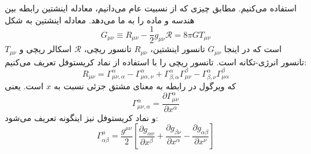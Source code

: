 \cite{dodelson2003modern}
استفاده می‌کنیم. مطابق چیزی که از نسبیت عام می‌دانیم، معادله اینشتین رابطه بین هندسه و ماده را به ما می‌دهد. معادله اینشتین به شکل
 \begin{equation}
G_{\mu\nu} \equiv R_{\mu\nu} - \frac{1}{2} g_{\mu\nu} \mathcal{R} = 8\pi G T_{\mu\nu}
\end{equation}     
است که در اینجا 
$G_{\mu\nu}$
تانسور اینشتین، 
$R_{\mu\nu}$
تانسور ریچی،
$\mathcal{R}$
اسکالر ریچی و 
$T_{\mu\nu}$
تانسور انرژی-تکانه است. 
تانسور ریچی را با استفاده از نماد کریستوفل تعریف می‌کنیم:
\begin{equation}
R_{\mu\nu} = \Gamma^{\alpha}_{\mu \nu , \alpha} - \Gamma^{\alpha}_{\mu \alpha , \nu}
+ \Gamma^{\alpha}_{\beta , \alpha} \Gamma^{\beta}_{\mu \nu}
- \Gamma^{\alpha}_{\beta , \nu} \Gamma^{\beta}_{\mu \alpha}
\end{equation}  
که ویرگول در رابطه به معنای مشتق جزئی نسبت به $x$ است. یعنی
\begin{equation}
\Gamma^{\alpha}_{\mu \nu , \alpha} = \frac{\partial \Gamma^{\alpha}_{\mu \nu } }{\partial x^{\alpha}}
\end{equation} 
و نماد کریستوفل نیز اینگونه تعریف می‌شود: 
\begin{equation}
\Gamma^{\mu}_{\alpha \beta } = \frac{g^{\mu \nu}}{2} [\frac{\partial g_{\alpha \nu}}{\partial x^{\beta}}
+ \frac{\partial g_{\beta \nu}}{\partial x^{\alpha}}
- \frac{\partial g_{\alpha \beta}}{\partial x^{\nu}}]
\end{equation} 

